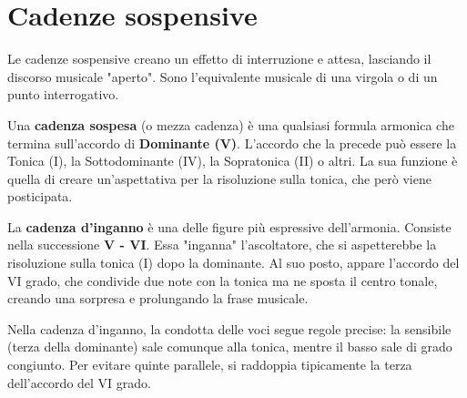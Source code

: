 	\begin{esempio}
		\label{ex:cadenza_plagale}
	\end{esempio}
	
	\section{Cadenze sospensive}
	\label{sec:cadenze_sospensive}
	
	Le cadenze sospensive creano un effetto di interruzione e attesa, lasciando il discorso musicale "aperto". Sono l'equivalente musicale di una virgola o di un punto interrogativo.
	
	\begin{definizione}
		\label{def:cadenza_sospesa}
		Una \textbf{cadenza sospesa} (o mezza cadenza) è una qualsiasi formula armonica che termina sull'accordo di \textbf{Dominante (V)}. L'accordo che la precede può essere la Tonica (I), la Sottodominante (IV), la Sopratonica (II) o altri. La sua funzione è quella di creare un'aspettativa per la risoluzione sulla tonica, che però viene posticipata.
	\end{definizione}
	
	\begin{esempio}
		\label{ex:cadenza_sospesa}
	\end{esempio}
	
	\begin{definizione}
		\label{def:cadenza_inganno}
		La \textbf{cadenza d'inganno} è una delle figure più espressive dell'armonia. Consiste nella successione \textbf{V - VI}. Essa "inganna" l'ascoltatore, che si aspetterebbe la risoluzione sulla tonica (I) dopo la dominante. Al suo posto, appare l'accordo del VI grado, che condivide due note con la tonica ma ne sposta il centro tonale, creando una sorpresa e prolungando la frase musicale.
	\end{definizione}
	
	Nella cadenza d'inganno, la condotta delle voci segue regole precise: la sensibile (terza della dominante) sale comunque alla tonica, mentre il basso sale di grado congiunto. Per evitare quinte parallele, si raddoppia tipicamente la terza dell'accordo del VI grado.
	
	\begin{esempio}
		\label{ex:cadenza_inganno}
	\end{esempio}
	
